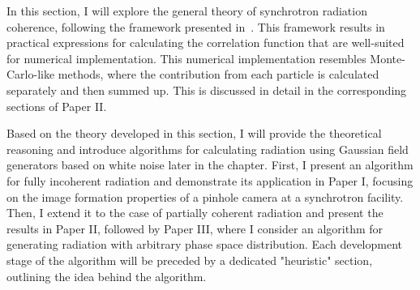     In this section, I will explore the general theory of synchrotron radiation coherence, following the framework presented in~\cite{geloni_statistical_2006}. This framework results in practical expressions for calculating the correlation function that are well-suited for numerical implementation. This numerical implementation resembles Monte-Carlo-like methods, where the contribution from each particle is calculated separately and then summed up. This is discussed in detail in the corresponding sections of Paper II.

    Based on the theory developed in this section, I will provide the theoretical reasoning and introduce algorithms for calculating radiation using Gaussian field generators based on white noise  later in the chapter. First, I present an algorithm for fully incoherent radiation and demonstrate its application in Paper I, focusing on the image formation properties of a pinhole camera at a synchrotron facility. Then, I extend it to the case of partially coherent radiation and present the results in Paper II, followed by Paper III, where I consider an algorithm for generating radiation with arbitrary phase space distribution. Each development stage of the algorithm will be preceded by a dedicated "heuristic" section, outlining the idea behind the algorithm.

